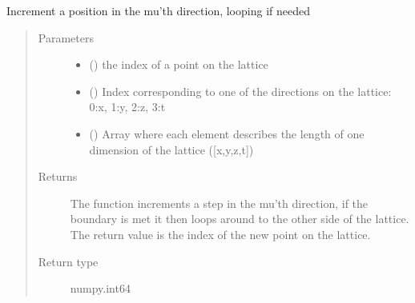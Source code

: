 \documentclass[letterpaper,10pt,english]{sphinxmanual}
\begin{document}
\begin{fulllineitems}
\label{\detokenize{index:su2.mupi}}
Increment a position in the mu’th direction, looping if needed
\begin{quote}\begin{description}
\item[{Parameters}] \leavevmode\begin{itemize}
\item {} 
 () \textendash{} the index of a point on the lattice

\item {} 
 () \textendash{} Index corresponding to one of the directions on the lattice:
0:x, 1:y, 2:z, 3:t

\item {} 
 () \textendash{} Array where each element describes the length of one dimension
of the lattice ({[}x,y,z,t{]})

\end{itemize}

\item[{Returns}] \leavevmode
The function increments a step in the mu’th direction, if the
boundary is met it then loops around to the other side of the
lattice. The return value is the index of the new point on the
lattice.

\item[{Return type}] \leavevmode
numpy.int64

\end{description}\end{quote}

\end{fulllineitems}

\end{document}
